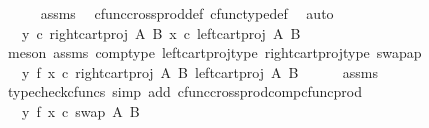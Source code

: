 \begin{isabellebody}
\ \ \ \ \isamarkupfalse%
\ assms\ \isamarkupfalse%
\ cfunc{\isacharunderscore}{\kern0pt}cross{\isacharunderscore}{\kern0pt}prod{\isacharunderscore}{\kern0pt}def\ cfunc{\isacharunderscore}{\kern0pt}type{\isacharunderscore}{\kern0pt}def\ \isamarkupfalse%
\ auto\isanewline
\ \ \isamarkupfalse%
\ \isamarkupfalse%
\ {\isachardoublequoteopen}{\isachardot}{\kern0pt}{\isachardot}{\kern0pt}{\isachardot}{\kern0pt}\ {\isacharequal}{\kern0pt}\ {\isasymlangle}y\ {\isasymcirc}\isactrlsub c\ right{\isacharunderscore}{\kern0pt}cart{\isacharunderscore}{\kern0pt}proj\ A\ B{\isacharcomma}{\kern0pt}\ x\ {\isasymcirc}\isactrlsub c\ left{\isacharunderscore}{\kern0pt}cart{\isacharunderscore}{\kern0pt}proj\ A\ B{\isasymrangle}{\isachardoublequoteclose}\isanewline
\ \ \ \ \isamarkupfalse%
\ {\isacharparenleft}{\kern0pt}meson\ assms\ comp{\isacharunderscore}{\kern0pt}type\ left{\isacharunderscore}{\kern0pt}cart{\isacharunderscore}{\kern0pt}proj{\isacharunderscore}{\kern0pt}type\ right{\isacharunderscore}{\kern0pt}cart{\isacharunderscore}{\kern0pt}proj{\isacharunderscore}{\kern0pt}type\ swap{\isacharunderscore}{\kern0pt}ap{\isacharparenright}{\kern0pt}\isanewline
\ \ \isamarkupfalse%
\ \isamarkupfalse%
\ {\isachardoublequoteopen}{\isachardot}{\kern0pt}{\isachardot}{\kern0pt}{\isachardot}{\kern0pt}\ {\isacharequal}{\kern0pt}\ {\isacharparenleft}{\kern0pt}y\ {\isasymtimes}\isactrlsub f\ x{\isacharparenright}{\kern0pt}\ {\isasymcirc}\isactrlsub c\ {\isasymlangle}right{\isacharunderscore}{\kern0pt}cart{\isacharunderscore}{\kern0pt}proj\ A\ B{\isacharcomma}{\kern0pt}\ left{\isacharunderscore}{\kern0pt}cart{\isacharunderscore}{\kern0pt}proj\ A\ B{\isasymrangle}{\isachardoublequoteclose}\isanewline
\ \ \ \ \isamarkupfalse%
\ assms\ \isamarkupfalse%
\ {\isacharparenleft}{\kern0pt}typecheck{\isacharunderscore}{\kern0pt}cfuncs{\isacharcomma}{\kern0pt}\ simp\ add{\isacharcolon}{\kern0pt}\ cfunc{\isacharunderscore}{\kern0pt}cross{\isacharunderscore}{\kern0pt}prod{\isacharunderscore}{\kern0pt}comp{\isacharunderscore}{\kern0pt}cfunc{\isacharunderscore}{\kern0pt}prod{\isacharparenright}{\kern0pt}\isanewline
\ \ \isamarkupfalse%
\ \isamarkupfalse%
\ {\isachardoublequoteopen}{\isachardot}{\kern0pt}{\isachardot}{\kern0pt}{\isachardot}{\kern0pt}\ {\isacharequal}{\kern0pt}\ {\isacharparenleft}{\kern0pt}y\ {\isasymtimes}\isactrlsub f\ x{\isacharparenright}{\kern0pt}\ {\isasymcirc}\isactrlsub c\ swap\ A\ B{\isachardoublequoteclose}\isanewline

\end{isabellebody}
